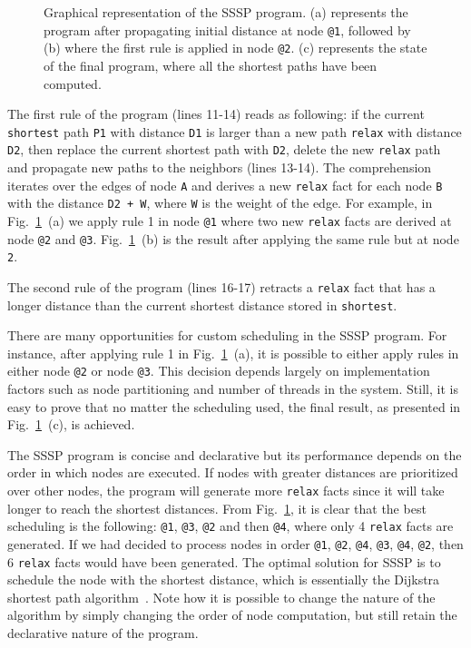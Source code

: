\begin{figure}
\begin{center}
\begin{subfigure}[b]{0.4\textwidth}
   \end{subfigure}
\end{center}
\caption{Graphical representation of the SSSP program. (a) represents the
   program after propagating initial distance at node \texttt{@1}, followed by
   (b) where the first rule is applied in node \texttt{@2}. (c)
   represents the state of the final program, where all the shortest paths
   have been computed.}
\label{fig:shortest_path_program}
\end{figure}

The first rule of the program (lines 11-14) reads as following: if the current
\texttt{shortest} path \texttt{P1} with distance \texttt{D1} is larger than a
new path \texttt{relax} with distance \texttt{D2}, then replace the current
shortest path with \texttt{D2}, delete the new \texttt{relax} path and propagate
new paths to the neighbors (lines 13-14).  The comprehension iterates over the
edges of node \texttt{A} and derives a new \texttt{relax} fact for each node
\texttt{B} with the distance \texttt{D2 + W}, where \texttt{W} is the weight of
the edge. For example, in Fig.~\ref{fig:shortest_path_program}~(a) we apply rule
1 in node \texttt{@1} where two new \texttt{relax} facts are derived at node
\texttt{@2} and \texttt{@3}. Fig.~\ref{fig:shortest_path_program}~(b) is the
result after applying the same rule but at node \texttt{2}.

The second rule of the program (lines 16-17) retracts a \texttt{relax} fact
that has a longer distance than the current shortest distance stored in
\texttt{shortest}.

There are many opportunities for custom scheduling in the SSSP program. For
instance, after applying rule 1 in Fig.~\ref{fig:shortest_path_program}~(a), it
is possible to either apply rules in either node \texttt{@2} or node
\texttt{@3}. This decision depends largely on implementation factors such as
node partitioning and number of threads in the system.  Still, it is easy to
prove that no matter the scheduling used, the final result, as presented in
Fig.~\ref{fig:shortest_path_program}~(c), is achieved.

The SSSP program is concise and declarative but its performance depends on the
order in which nodes are executed. If nodes with greater distances are
prioritized over other nodes, the program will generate more \texttt{relax}
facts since it will take longer to reach the shortest distances. From
Fig.~\ref{fig:shortest_path_program}, it is clear that the best scheduling is
the following: \texttt{@1}, \texttt{@3}, \texttt{@2} and then \texttt{@4}, where
only 4 \texttt{relax} facts are generated. If we had decided to process nodes in
order \texttt{@1}, \texttt{@2}, \texttt{@4}, \texttt{@3}, \texttt{@4},
\texttt{@2}, then 6 \texttt{relax} facts would have been generated.  The optimal
solution for SSSP is to schedule the node with the shortest distance, which is
essentially the Dijkstra shortest path algorithm~\cite{Dijkstra}. Note how it is
possible to change the nature of the algorithm by simply changing the order of
node computation, but still retain the declarative nature of the program.

